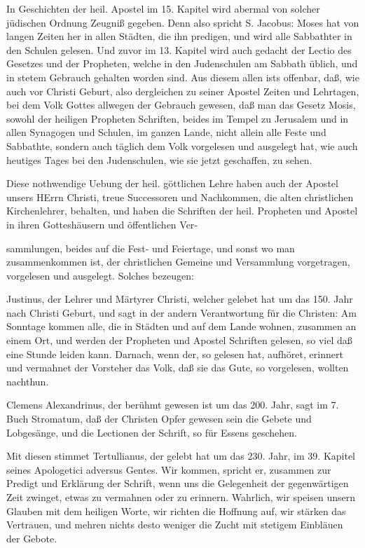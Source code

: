 In Geschichten der heil. Apostel im 15. Kapitel wird abermal von solcher jüdischen Ordnung Zeugniß gegeben. Denn also spricht S. Jacobus: Moses hat von langen Zeiten her in allen Städten, die ihn predigen, und wird alle Sabbathter in den Schulen gelesen. Und zuvor im 13. Kapitel wird auch gedacht der Lectio des Gesetzes und der Propheten, welche in den Judenschulen am Sabbath üblich, und in stetem Gebrauch gehalten worden sind. Aus diesem allen ists offenbar, daß, wie auch vor Christi Geburt, also dergleichen zu seiner Apostel Zeiten und Lehrtagen, bei dem Volk Gottes allwegen der Gebrauch gewesen, daß man das Gesetz Mosis, sowohl der heiligen Propheten Schriften, beides im Tempel zu Jerusalem und in allen Synagogen und Schulen, im ganzen Lande, nicht allein alle Feste und Sabbathte, sondern auch täglich dem Volk vorgelesen und ausgelegt hat, wie auch heutiges Tages bei den Judenschulen, wie sie jetzt geschaffen, zu sehen.

Diese nothwendige Uebung der heil. göttlichen Lehre haben auch der Apostel unsers HErrn Christi, treue Successoren und Nachkommen, die alten christlichen Kirchenlehrer, behalten, und haben die Schriften der heil. Propheten und Apostel in ihren Gotteshäusern und öffentlichen Ver-


sammlungen, beides auf die Fest- und Feiertage, und sonst wo man zusammenkommen ist, der christlichen Gemeine und Versammlung vorgetragen, vorgelesen und ausgelegt. Solches bezeugen:

Justinus, der Lehrer und Märtyrer Christi, welcher gelebet hat um das 150. Jahr nach Christi Geburt, und sagt in der andern Verantwortung für die Christen: Am Sonntage kommen alle, die in Städten und auf dem Lande wohnen, zusammen an einem Ort, und werden der Propheten und Apostel Schriften gelesen, so viel daß eine Stunde leiden kann. Darnach, wenn der, so gelesen hat, aufhöret, erinnert und vermahnet der Vorsteher das Volk, daß sie das Gute, so vorgelesen, wollten nachthun.

Clemens Alexandrinus, der berühmt gewesen ist um das 200. Jahr, sagt im 7. Buch Stromatum, daß der Christen Opfer gewesen sein die Gebete und Lobgesänge, und die Lectionen der Schrift, so für Essens geschehen.

Mit diesen stimmet Tertullianus, der gelebt hat um das 230. Jahr, im 39. Kapitel seines Apologetici adversus Gentes. Wir kommen, spricht er, zusammen zur Predigt und Erklärung der Schrift, wenn uns die Gelegenheit der gegenwärtigen Zeit zwinget, etwas zu vermahnen oder zu erinnern. Wahrlich, wir speisen unsern Glauben mit dem heiligen Worte, wir richten die Hoffnung auf, wir stärken das Vertrauen, und mehren nichts desto weniger die Zucht mit stetigem Einbläuen der Gebote.

